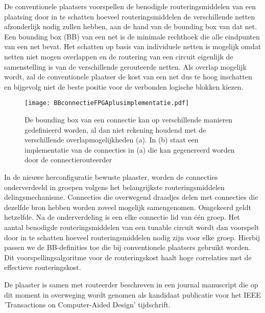 \documentclass[a4paper,oneside,12pt]{article}
\begin{document}
De conventionele plaatsers voorspellen de benodigde routeringsmiddelen van een plaatsing door in te schatten hoeveel routeringsmiddelen de verschillende netten afzonderlijk nodig zullen hebben, aan de hand van de bounding box van dat net. Een bounding box (BB) van een net is de minimale rechthoek die alle eindpunten van een net bevat. Het schatten op basis van individuele netten is mogelijk omdat netten niet mogen overlappen en de routering van een circuit eigenlijk de samenstelling is van de verschillende gerouteerde netten. Als overlap mogelijk wordt, zal de conventionele plaatser de kost van een net dus te hoog inschatten en bijgevolg niet de beste positie voor de verbonden logische blokken kiezen. 

\begin{figure}
\centering
\texttt{[image: BBconnectieFPGAplusimplementatie.pdf]}
\caption{%
De bounding box van een connectie kan op verschillende manieren gedefinieerd worden, al dan niet rekening houdend met de verschillende overlapmogelijkheden (a). In (b) staat een implementatie van de connecties in (a) die kan gegenereerd worden door de connectierouteerder}
\label{BBconnectieFPGAplusimplementatie}
\end{figure}

In de nieuwe herconfiguratie bewuste plaaster, worden de connecties onderverdeeld in groepen volgens het belangrijkste routeringsmiddelen delingsmechanisme. Connecties die overwegend draadjes delen met connecties die dezelfde bron hebben worden zoveel mogelijk samengenomen. Omgekeerd geldt hetzelfde. Na de onderverdeling is een elke connectie lid van \'e\'en groep.
Het aantal benodigde routeringsmiddelen van een tunable circuit wordt dan voorspelt door in te schatten hoeveel routeringsmiddelen nodig zijn voor elke groep. Hierbij passen we de BB-definities toe die bij conventionele plaatsers gebruikt worden. Dit voorspellingsalgoritme voor de routeringskost haalt hoge correlaties met de effectieve routeringskost.

De plaaster is samen met routeerder beschreven in een journal manuscript die op dit moment in overweging wordt genomen als kandidaat publicatie voor het IEEE 'Transactions on Computer-Aided Design' tijdschrift. 

\newpage
\end{document}
